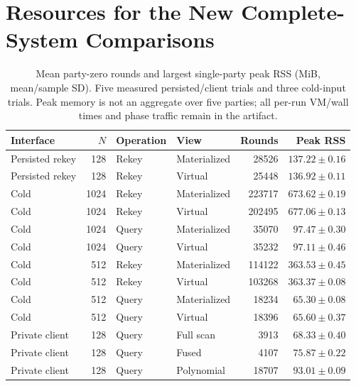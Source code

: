 \section{Resources for the New Complete-System Comparisons}
\begin{table}[t]
\caption{Mean party-zero rounds and largest single-party peak RSS (MiB, mean/sample SD). Five measured persisted/client trials and three cold-input trials. Peak memory is not an aggregate over five parties; all per-run VM/wall times and phase traffic remain in the artifact.}
\label{tab:v3resources}\centering\small
\setlength{\tabcolsep}{3pt}
\begin{tabular}{lrllrr}
\toprule
Interface & $N$ & Operation & View & Rounds & Peak RSS \\
\midrule
Persisted rekey & 128 & Rekey & Materialized & 28526 & $137.22\pm0.16$ \\
Persisted rekey & 128 & Rekey & Virtual & 25448 & $136.92\pm0.11$ \\
Cold & 1024 & Rekey & Materialized & 223717 & $673.62\pm0.19$ \\
Cold & 1024 & Rekey & Virtual & 202495 & $677.06\pm0.13$ \\
Cold & 1024 & Query & Materialized & 35070 & $97.47\pm0.30$ \\
Cold & 1024 & Query & Virtual & 35232 & $97.11\pm0.46$ \\
Cold & 512 & Rekey & Materialized & 114122 & $363.53\pm0.45$ \\
Cold & 512 & Rekey & Virtual & 103268 & $363.37\pm0.08$ \\
Cold & 512 & Query & Materialized & 18234 & $65.30\pm0.08$ \\
Cold & 512 & Query & Virtual & 18396 & $65.60\pm0.37$ \\
Private client & 128 & Query & Full scan & 3913 & $68.33\pm0.40$ \\
Private client & 128 & Query & Fused & 4107 & $75.87\pm0.22$ \\
Private client & 128 & Query & Polynomial & 18707 & $93.01\pm0.09$ \\
\bottomrule
\end{tabular}
\end{table}


